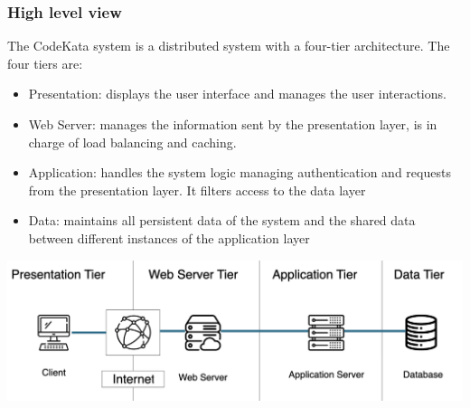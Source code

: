 \documentclass{article}
\begin{document}
\subsubsection{High level view}
The CodeKata system is a distributed system with a four-tier architecture. The four tiers are:
\begin{itemize}
\item Presentation: displays the user interface and manages the user interactions.  
\item Web Server: manages the information sent by the presentation layer, is in charge of load balancing and caching.
\item Application: handles the system logic managing authentication and requests from the presentation layer. It filters access to the data layer
\item Data: maintains all persistent data of the system and the shared data between different instances of the application layer
\end{itemize}

\begin{center}
    \includegraphics[width=\linewidth]{hlv1.png}
  \label{fig:hlv1}
\end{center}
\end{document}
